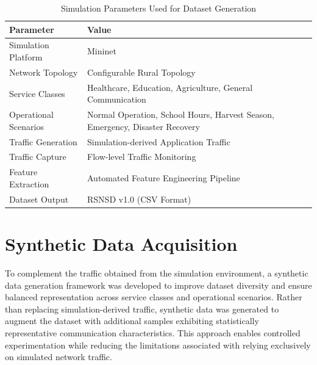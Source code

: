 \documentclass[12pt,a4paper]{report}
\begin{document}
	\begin{table}[H]
		\centering
		\caption{Simulation Parameters Used for Dataset Generation}
		\label{tab:simulation_parameters}
		
		\begin{tabular}{|p{5cm}|p{10cm}|}
			\hline
			
			\textbf{Parameter} &
			\textbf{Value}
			\\
			\hline
			
			Simulation Platform &
			Mininet
			\\
			\hline
			
			Network Topology &
			Configurable Rural Topology
			\\
			\hline
			
			Service Classes &
			Healthcare, Education, Agriculture, General Communication
			\\
			\hline
			
			Operational Scenarios &
			Normal Operation, School Hours, Harvest Season, Emergency, Disaster Recovery
			\\
			\hline
			
			Traffic Generation &
			Simulation-derived Application Traffic
			\\
			\hline
			
			Traffic Capture &
			Flow-level Traffic Monitoring
			\\
			\hline
			
			Feature Extraction &
			Automated Feature Engineering Pipeline
			\\
			\hline
			
			Dataset Output &
			RSNSD v1.0 (CSV Format)
			\\
			\hline
			
		\end{tabular}
		
	\end{table}
	
	\section{Synthetic Data Acquisition}
	\label{sec:synthetic_generation}
	
	To complement the traffic obtained from the simulation environment, a synthetic data generation framework was developed to improve dataset diversity and ensure balanced representation across service classes and operational scenarios. Rather than replacing simulation-derived traffic, synthetic data was generated to augment the dataset with additional samples exhibiting statistically representative communication characteristics. This approach enables controlled experimentation while reducing the limitations associated with relying exclusively on simulated network traffic.
	
\end{document}
